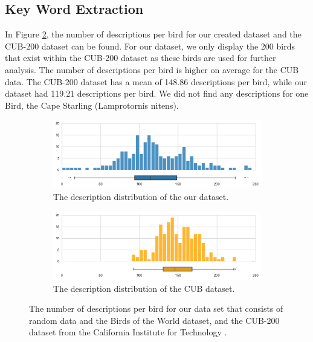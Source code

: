 \documentclass[a4paper, 12pt, oneside]{book} %
\begin{document}
\subsection{Key Word Extraction} \label{par:results_keywords}
In Figure \ref{fig:CUB_distribution}, the number of descriptions per bird for our created dataset and the CUB-200 dataset can be found.
For our dataset, we only display the 200 birds that exist within the CUB-200 dataset as these birds are used for further analysis.
The number of descriptions per bird is higher on average for the CUB data.
The CUB-200 dataset has a mean of 148.86 descriptions per bird, while our dataset had 119.21 descriptions per bird.
We did not find any descriptions for one Bird, the Cape Starling (Lamprotornis nitens).
\begin{figure} [htpb]
     \centering
     \begin{subfigure}[b]{1\textwidth}
         \centering
         \includegraphics[width=\textwidth]{figures/CUB_distribution_BOW.pdf}
         \caption{The description distribution of the our dataset.}
         \label{fig:BOW_distribution}
     \end{subfigure}
     \vfill
     \begin{subfigure}[b]{1\textwidth}
         \centering
         \includegraphics[width=\textwidth]{figures/CUB_distribution_CUB.pdf}
         \caption{The description distribution of the CUB dataset.}
         \label{fig:CUB_distribution}
     \end{subfigure}
     \caption[Bird description distribution]{The number of descriptions per bird for our data set that consists of random data and the Birds of the World dataset, and the CUB-200 dataset from the California Institute for Technology \autocite{welinder_caltech-ucsd_2010}. }
 \label{fig:CUBBOW_distribution}
\end{figure}
\end{document}
